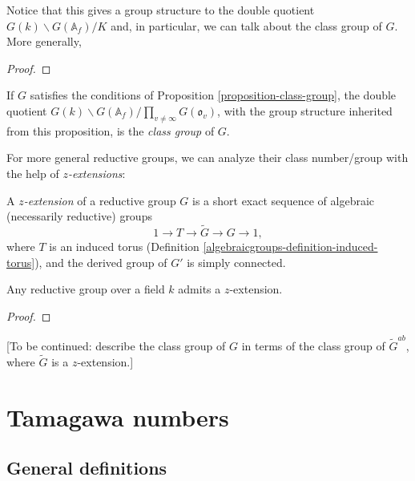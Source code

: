 Notice that this gives a group structure to the double quotient $G(k)\backslash G(\mathbb A_f)/K$ and, in particular, we can talk about the class group of $G$. More generally, 

\begin{proposition}
 \label{proposition-class-group}
 \cite[Proposition 8.8]{Platonov-Rapinchuk}
\end{proposition}

\begin{proof}
 
\end{proof}


\begin{definition}
 \label{definition-class-group}
If $G$ satisfies the conditions of Proposition \ref{proposition-class-group}, the double quotient $G(k)\backslash G(\mathbb A_f)/\prod_{v\ne \infty} G(\mathfrak o_v)$, with the group structure inherited from this proposition, is the {\it class group} of $G$. 
\end{definition}

For more general reductive groups, we can analyze their class number/group with the help of \emph{$z$-extensions}:

\begin{definition}
 \label{definition-z-extention}
A {\it $z$-extension} of a reductive group $G$ is a short exact sequence of algebraic (necessarily reductive) groups
$$ 1\to T\to \tilde G\to G\to 1,$$
where $T$ is an induced torus (Definition \ref{algebraicgroups-definition-induced-torus}), and the derived group of $G'$ is simply connected.
\end{definition}

\begin{proposition}
 \label{proposition-z-extension-exists}
Any reductive group over a field $k$ admits a $z$-extension.
\end{proposition}


\begin{proof}
\end{proof}

[To be continued: describe the class group of $G$ in terms of the class group of $\tilde G^{ab}$, where $\tilde G$ is a $z$-extension.]

\section{Tamagawa numbers}
\label{section-Tamagawa-numbers}

\subsection{General definitions}
\label{subsection-Tamagawa-definitions}

